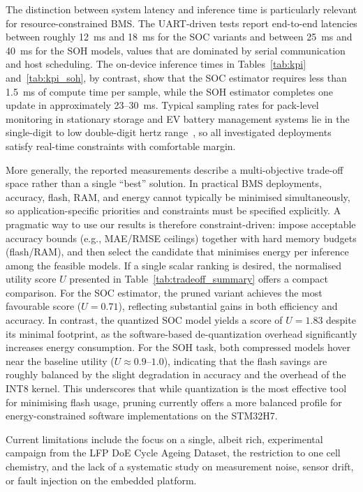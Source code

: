 \documentclass[final,3p,times]{elsarticle}
\begin{document}
The distinction between system latency and inference time is particularly relevant for resource-constrained BMS. The UART-driven tests report end-to-end latencies between roughly 12~ms and 18~ms for the SOC variants and between 25~ms and 40~ms for the SOH models, values that are dominated by serial communication and host scheduling. The on-device inference times in Tables~\ref{tab:kpi} and~\ref{tab:kpi_soh}, by contrast, show that the SOC estimator requires less than 1.5~ms of compute time per sample, while the SOH estimator completes one update in approximately 23--30~ms. Typical sampling rates for pack-level monitoring in stationary storage and EV battery management systems lie in the single-digit to low double-digit hertz range~\cite{plettBatteryManagementSystems2015,berecibarCriticalReviewState2016}, so all investigated deployments satisfy real-time constraints with comfortable margin.

More generally, the reported measurements describe a multi-objective trade-off space rather than a single ``best'' solution. In practical BMS deployments, accuracy, flash, RAM, and energy cannot typically be minimised simultaneously, so application-specific priorities and constraints must be specified explicitly. A pragmatic way to use our results is therefore constraint-driven: impose acceptable accuracy bounds (e.g., MAE/RMSE ceilings) together with hard memory budgets (flash/RAM), and then select the candidate that minimises energy per inference among the feasible models. If a single scalar ranking is desired, the normalised utility score $U$ presented in Table~\ref{tab:tradeoff_summary} offers a compact comparison. For the SOC estimator, the pruned variant achieves the most favourable score ($U=0.71$), reflecting substantial gains in both efficiency and accuracy. In contrast, the quantized SOC model yields a score of $U=1.83$ despite its minimal footprint, as the software-based de-quantization overhead significantly increases energy consumption. For the SOH task, both compressed models hover near the baseline utility ($U \approx 0.9$--$1.0$), indicating that the flash savings are roughly balanced by the slight degradation in accuracy and the overhead of the INT8 kernel. This underscores that while quantization is the most effective tool for minimising flash usage, pruning currently offers a more balanced profile for energy-constrained software implementations on the STM32H7.

Current limitations include the focus on a single, albeit rich, experimental campaign from the LFP DoE Cycle Ageing Dataset, the restriction to one cell chemistry, and the lack of a systematic study on measurement noise, sensor drift, or fault injection on the embedded platform.
\end{document}
